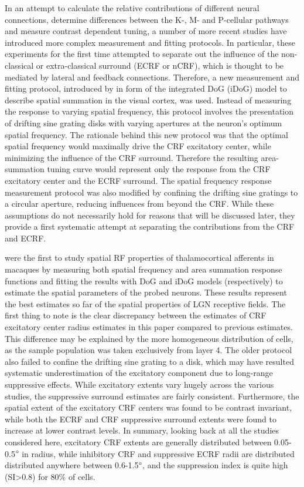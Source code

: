 In an attempt to calculate the relative contributions of different
neural connections, determine differences between the K-, M- and
P-cellular pathways and measure contrast dependent tuning, a number of
more recent studies have introduced more complex measurement and
fitting protocols. In particular, these experiments for the first time
attempted to separate out the influence of the non-classical or
extra-classical surround (ECRF or nCRF), which is thought to be
mediated by lateral and feedback connections. Therefore, a new
measurement and fitting protocol, introduced by \cite{Sceniak1999} in
form of the integrated DoG (iDoG) model to describe spatial summation
in the visual cortex, was used. Instead of measuring the response to
varying spatial frequency, this protocol involves the presentation of
drifting sine grating disks with varying apertures at the neuron's
optimum spatial frequency. The rationale behind this new protocol was
that the optimal spatial frequency would maximally drive the CRF
excitatory center, while minimizing the influence of the CRF
surround. Therefore the resulting area-summation tuning curve would
represent only the response from the CRF excitatory center and the
ECRF surround. The spatial frequency response measurement
protocol was also modified by confining the drifting sine gratings to a
circular aperture, reducing influences from beyond the CRF. While
these assumptions do not necessarily hold for reasons that will be
discussed later, they provide a first systematic attempt at separating
the contributions from the CRF and ECRF.

\cite{Sceniak2006} were the first to study spatial RF properties of
thalamocortical afferents in macaques by measuring both spatial
frequency and area summation response functions and fitting the
results with DoG and iDoG models (respectively) to estimate the
spatial parameters of the probed neurons. These results represent the
best estimates so far of the spatial properties of LGN receptive
fields. The first thing to note is the clear discrepancy between the
estimates of CRF excitatory center radius estimates in this paper
compared to previous estimates. This difference may be explained by
the more homogeneous distribution of cells, as the sample population
was taken exclusively from layer 4. The older protocol also failed to
confine the drifting sine grating to a disk, which may have resulted
systematic underestimation of the excitatory component due to
long-range suppressive effects. While excitatory extents vary hugely
across the various studies, the suppressive surround estimates are
fairly consistent. Furthermore, the spatial extent of the excitatory
CRF centers was found to be contrast invariant, while both the ECRF
and CRF suppressive surround extents were found to increase at lower
contrast levels. In summary, looking back at all the studies
considered here, excitatory CRF extents are generally distributed
between 0.05-0.5$\degree$ in radius, while inhibitory CRF and
suppressive ECRF radii are distributed distributed anywhere between
0.6-1.5$\degree$, and the suppression index is quite high
(SI\textgreater0.8) for 80\% of cells.

